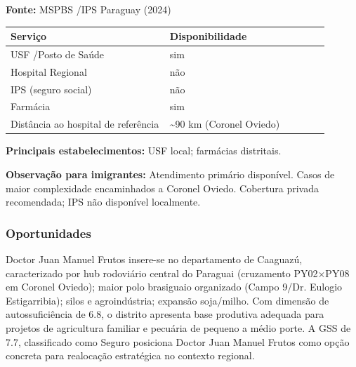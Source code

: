 \textbf{Fonte:} MSPBS /\allowbreak  IPS Paraguay (2024)

{\def\LTcaptype{none} %
\begin{longtable}{@{}>{\raggedright\arraybackslash}p{0.45\linewidth} >{\raggedright\arraybackslash}p{0.45\linewidth}@{}}
\toprule\noalign{}
Serviço & Disponibilidade \\
\midrule\noalign{}
\endhead
\bottomrule\noalign{}
\endlastfoot
USF /\allowbreak  Posto de Saúde & sim \\
Hospital Regional & não \\
IPS (seguro social) & não \\
Farmácia & sim \\
Distância ao hospital de referência & \textasciitilde90 km (Coronel
Oviedo) \\
\end{longtable}
}

\textbf{Principais estabelecimentos:} USF local; farmácias distritais.

\textbf{Observação para imigrantes:} Atendimento primário disponível.
Casos de maior complexidade encaminhados a Coronel Oviedo. Cobertura
privada recomendada; IPS não disponível localmente.
\newpage

\subsubsection*{Oportunidades}\label{oport-doctor-juan-manuel-frutos-0513}
Doctor Juan Manuel Frutos insere-se no departamento de Caaguazú, caracterizado por hub rodoviário central do Paraguai (cruzamento PY02×PY08 em Coronel Oviedo); maior polo brasiguaio organizado (Campo 9/Dr. Eulogio Estigarribia); silos e agroindústria; expansão soja/milho. Com dimensão de autossuficiência de 6.8, o distrito apresenta base produtiva adequada para projetos de agricultura familiar e pecuária de pequeno a médio porte. A GSS de 7.7, classificado como Seguro posiciona Doctor Juan Manuel Frutos como opção concreta para realocação estratégica no contexto regional.

